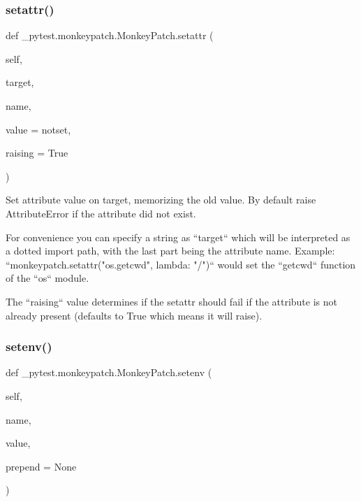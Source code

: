 \subsubsection{\texorpdfstring{setattr()}{setattr()}}
{\footnotesize\ttfamily def \+\_\+pytest.\+monkeypatch.\+Monkey\+Patch.\+setattr (\begin{DoxyParamCaption}\item[{}]{self,  }\item[{}]{target,  }\item[{}]{name,  }\item[{}]{value = {\ttfamily notset},  }\item[{}]{raising = {\ttfamily True} }\end{DoxyParamCaption})}

\begin{DoxyVerb}Set attribute value on target, memorizing the old value.
By default raise AttributeError if the attribute did not exist.

For convenience you can specify a string as ``target`` which
will be interpreted as a dotted import path, with the last part
being the attribute name.  Example:
``monkeypatch.setattr("os.getcwd", lambda: "/")``
would set the ``getcwd`` function of the ``os`` module.

The ``raising`` value determines if the setattr should fail
if the attribute is not already present (defaults to True
which means it will raise).
\end{DoxyVerb}
 \mbox{\label{class__pytest_1_1monkeypatch_1_1_monkey_patch_a53fc05d4431d1790747d9ce7e82ce105}} 
\subsubsection{\texorpdfstring{setenv()}{setenv()}}
{\footnotesize\ttfamily def \+\_\+pytest.\+monkeypatch.\+Monkey\+Patch.\+setenv (\begin{DoxyParamCaption}\item[{}]{self,  }\item[{}]{name,  }\item[{}]{value,  }\item[{}]{prepend = {\ttfamily None} }\end{DoxyParamCaption})}

